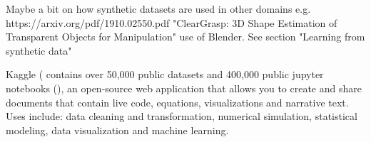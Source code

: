 



Maybe a bit on how synthetic datasets are used in other domains e.g. https://arxiv.org/pdf/1910.02550.pdf "ClearGrasp:
3D Shape Estimation of Transparent Objects for Manipulation" use of Blender. See section "Learning from synthetic data"








Kaggle (\cite{kaggle_2020} contains over 50,000 public datasets and 400,000 public jupyter notebooks (\cite{JupyterNotebook2020}), an open-source web application that allows you to create and share documents that contain live code, equations, visualizations and narrative text. Uses include: data cleaning and transformation, numerical simulation, statistical modeling, data visualization and machine learning.

